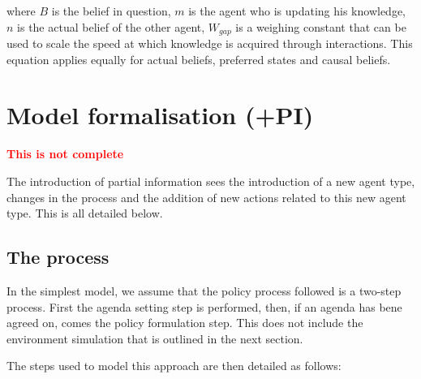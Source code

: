 \documentclass[11pt]{article}
\begin{document}
where $B$ is the belief in question, $m$ is the agent who is updating his knowledge, $n$ is the actual belief of the other agent, $W_{gap}$ is a weighing constant that can be used to scale the speed at which knowledge is acquired through interactions. This equation applies equally for actual beliefs, preferred states and causal beliefs.



\section{Model formalisation (+PI)}

{\bfseries \textcolor{red}{This is not complete}}

The introduction of partial information sees the introduction of a new agent type, changes in the process and the addition of new actions related to this new agent type. This is all detailed below.

\subsection{The process}

In the simplest model, we assume that the policy process followed is a two-step process. First the agenda setting step is performed, then, if an agenda has bene agreed on, comes the policy formulation step. This does not include the environment simulation that is outlined in the next section.

The steps used to model this approach are then detailed as follows:
\end{document}
